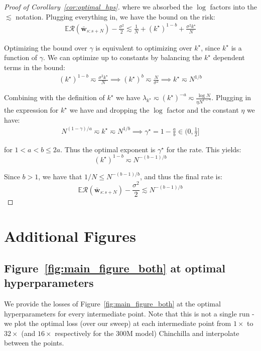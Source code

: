 \documentclass{article}
\def\bw{\bar{\mathbf{w}}}
\def\risk{\mathcal{R}}
\newcommand{\E}{\mathbb{E}}
\def\bw{\bar{\mathbf{w}}}
\def\risk{\mathcal{R}}
\theoremstyle{plain}
\def\bw{\bar{\mathbf{w}}}
\def\risk{\mathcal{R}}
\def\E{\mathbb{E}}
\begin{document}
\begin{proof}[Proof of Corollary~\ref{cor:optimal_hps}]
where we absorbed the $\log$ factors into the $\lesssim$ notation. Plugging everything in, we have the bound on the risk:
\begin{align*}
    \E\risk(\bw_{s:s+N}) - \frac{\sigma^2}{2} \lesssim \frac{1}{N} + (k^\star)^{1-b} + \frac{\sigma^2 k^\star}{N}
\end{align*}

Optimizing the bound over $\gamma$ is equivalent to optimizing over $k^\star$, since $k^\star$ is a function of $\gamma$. We can optimize up to constants by balancing the $k^\star$ dependent terms in the bound:
\begin{align*}
    (k^\star)^{1-b} \eqsim \frac{\sigma^2 k^\star}{N}
    \implies
    (k^\star)^{b} \eqsim \frac{N}{\sigma^2}
    \implies
    k^\star \eqsim N^{1/b}
\end{align*}

Combining with the definition of $k^\star$ we have $\lambda_{k^\star} \eqsim (k^\star)^{-a} \eqsim \frac{\log{N}}{\eta N^{1-\gamma}}$. Plugging in the expression for $k^\star$ we have and dropping the $\log$ factor and the constant $\eta$ we have:
\begin{align*}
    N^{(1-\gamma)/a} \eqsim k^\star \eqsim N^{1/b}
    \implies
    \gamma^\star = 1 - \frac{a}{b} \in (0, \frac{1}{2}]
\end{align*}

for $1 < a < b \leq 2a$. Thus the optimal exponent is $\gamma^\star$ for the rate. This yields:
\[
(k^\star)^{1-b} \eqsim N^{-(b-1)/b}
\]

Since $b>1$, we have that $1/N \leq N^{-(b-1)/b}$, and thus the final rate is:
\[
\E\risk(\bw_{s:s+N}) - \frac{\sigma^2}{2} \lesssim N^{-(b-1)/b}
\]
\end{proof}
\clearpage















\clearpage
\section{Additional Figures}
\label{app:additional_figures}
\subsection{Figure~\ref{fig:main_figure_both} at optimal hyperparameters}
We provide the losses of Figure~\ref{fig:main_figure_both} at the optimal hyperparameters for every intermediate point. Note that this is not a single run - we plot the optimal loss (over our sweep) at each intermediate point from $1 \times$ to $32 \times$ (and $16\times$ respectively for the 300M model) Chinchilla and interpolate between the points.
\end{document}
